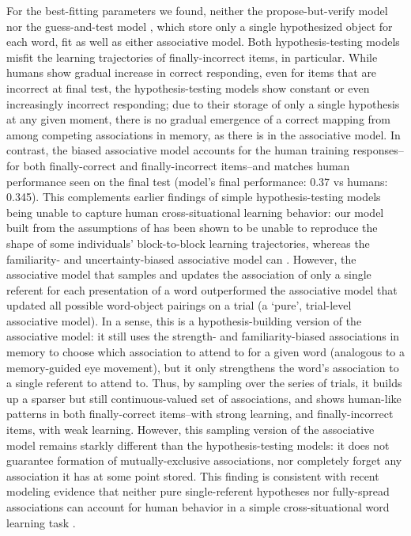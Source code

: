 \documentclass[man,floatsintext]{apa6}
\begin{document}
For the best-fitting parameters we found, neither the propose-but-verify model \citep{Trueswell:2013} nor the guess-and-test model \citep{Medina:2011}, which store only a single hypothesized object for each word, fit as well as either associative model. Both hypothesis-testing models misfit the learning trajectories of finally-incorrect items, in particular. While humans show gradual increase in correct responding, even for items that are incorrect at final test, the hypothesis-testing models show constant or even increasingly incorrect responding; due to their storage of only a single hypothesis at any given moment, there is no gradual emergence of a correct mapping from among competing associations in memory, as there is in the associative model.
 In contrast, the biased associative model \citep{Kachergis:2012gi} accounts for the human training responses--for both finally-correct and finally-incorrect items--and matches human performance seen on the final test (model's final performance: 0.37 vs humans: 0.345). This complements earlier findings of simple hypothesis-testing models being unable to capture human cross-situational learning behavior: our model built from the assumptions of \cite{Medina:2011} has been shown to be unable to reproduce the shape of some individuals' block-to-block learning trajectories, whereas the familiarity- and uncertainty-biased associative model can \citep{Kachergis:2012hyp}. However, the associative model that samples and updates the association of only a single referent for each presentation of a word outperformed the associative model that updated all possible word-object pairings on a trial (a `pure', trial-level associative model). In a sense, this is a hypothesis-building version of the associative model: it still uses the strength- and familiarity-biased associations in memory to choose which association to attend to for a given word (analogous to a memory-guided eye movement), but it only strengthens the word's association to a single referent to attend to. Thus, by sampling over the series of trials, it builds up a sparser but still continuous-valued set of associations, and shows human-like patterns in both finally-correct items--with strong learning, and finally-incorrect items, with weak learning. However, this sampling version of the associative model remains starkly different than the hypothesis-testing models: it does not guarantee formation of mutually-exclusive associations, nor completely forget any association it has at some point stored. This finding is consistent with recent modeling evidence that neither pure single-referent hypotheses nor fully-spread associations can account for human behavior in a simple cross-situational word learning task \citep{YurovskyFrank:2015}.
\end{document}
